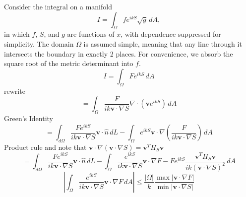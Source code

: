 \documentclass{article}
\newcommand{\abs}[1]{\left\lvert#1\right\rvert}
\theoremstyle{plain}
\begin{document}
Consider the integral on a manifold
\begin{equation}
    I = \int_\Omega f e^{ikS} \sqrt{g} \,dA,
\end{equation}
in which $f$, $S$, and $g$ are functions of $x$, with dependence suppressed for simplicity.
The domain $\Omega$ is assumed simple, meaning that any line through it intersects the boundary in exactly 2 places.
For convenience, we absorb the square root of the metric determinant into $f$.
\begin{equation}
    I = \int_\Omega F e^{ikS} \,dA
\end{equation}
rewrite
\begin{equation}
    = \int_\Omega \frac{F}{ik\mathbf{v}\cdot\nabla S} \nabla\cdot\left( \mathbf{v}e^{ikS} \right) \,dA
\end{equation}
Green's Identity
\begin{equation}
    = \int_{d\Omega} \frac{Fe^{ikS}}{ik\mathbf{v}\cdot\nabla S} \mathbf{v}\cdot\hat{n} \,dL
    - \int_\Omega e^{ikS} \mathbf{v}\cdot\nabla\left( \frac{F}{ik\mathbf{v}\cdot\nabla S} \right) \,dA
\end{equation}
Product rule and note that $\mathbf{v}\cdot\nabla\left(\mathbf{v}\cdot\nabla S\right) = \mathbf{v}^TH_S\mathbf{v}$
\begin{equation}
    = \int_{d\Omega} \frac{Fe^{ikS}}{ik\mathbf{v}\cdot\nabla S} \mathbf{v}\cdot\hat{n} \,dL
    - \int_\Omega \frac{ e^{ikS} }{ {ik\mathbf{v}\cdot\nabla S} } \mathbf{v}\cdot\nabla F
    - Fe^{ikS} \frac{\mathbf{v}^TH_S\mathbf{v}}{ ik\left(\mathbf{v}\cdot\nabla S\right)^2} \,dA
\end{equation}
\begin{equation}
    \abs{ \int_\Omega \frac{ e^{ikS} }{ {ik\mathbf{v}\cdot\nabla S} } \mathbf{v}\cdot\nabla F \,dA }
    \leq \frac{\abs{\Omega}}{k} \frac{\max\abs{\mathbf{v}\cdot\nabla F}}{\min\abs{\mathbf{v}\cdot\nabla S}}
\end{equation}


\end{document}
